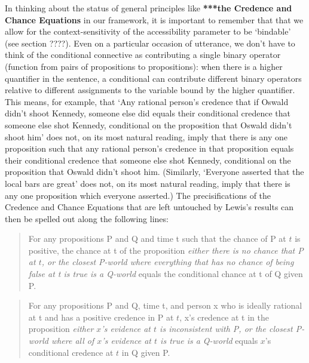 \documentclass[If.tex]{subfiles}
\begin{document}
In thinking about the status of general principles like \textbf{***the Credence and Chance Equations} in our framework, it is important to remember that that we allow for the context-sensitivity of the accessibility parameter to be ‘bindable’ (see section ????). Even on a particular occasion of utterance, we don't have to think of the conditional connective as contributing a single binary operator (function from pairs of propositions to propositions): when there is a higher quantifier in the sentence, a conditional can contribute different binary operators relative to different assignments to the variable bound by the higher quantifier. This means, for example, that `Any rational person's credence that if Oswald didn't shoot Kennedy, someone else did equals their conditional credence that someone else shot Kennedy, conditional on the proposition that Oswald didn't shoot him' does not, on its most natural reading, imply that there is any one proposition such that any rational person's credence in that proposition equals their conditional credence that someone else shot Kennedy, conditional on the proposition that Oswald didn't shoot him. (Similarly, ‘Everyone asserted that the local bars are great’ does not, on its most natural reading, imply that there is any one proposition which everyone asserted.) The precisifications of the Credence and Chance Equations that are left untouched by Lewis's results can then be spelled out along the following lines:
\begin{quote}
	For any propositions P and Q and time t such that the chance of P at $t$ is positive, the chance at t of the proposition \emph{either there is no chance that P at $t$, or the closest P-world where everything that has no chance of being false at t is true is a Q-world} equals the conditional chance at t of Q given P. 
\end{quote}
\begin{quote}
	For any propositions P and Q, time t, and person x who is ideally rational at t and has a positive credence in P at $t$, x's credence at t in the proposition \emph{either $x$'s evidence at $t$ is inconsistent with P, or the closest P-world where all of $x$'s evidence at $t$ is true is a Q-world} equals $x$'s conditional credence at $t$ in Q given P. 
\end{quote}
\end{document}
